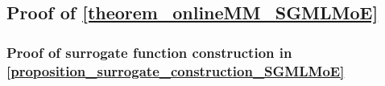 \documentclass{article}
\newcommand{\mdm}{softmax-gated multinomial logistic MoE }
\newcommand{\nn}{\nonumber} %
\newtheorem{proposition}{Proposition}
\def\sfg{\mathsf{g}}
\def\ex{\mathsf{e}}
\def\vxi{{\bm{\xi}}}
\def\vomega{{\bm{\omega}}}
\def\vupsilon{{\bm{\upsilon}}}
\def\vtheta{{\bm{\theta}}}
\def\vc{{\bm{c}}}
\def\vr{{\bm{r}}}
\def\vv{{\bm{v}}}
\def\vx{{\bm{x}}}
\def\evv{{v}}
\def\evw{{w}}
\def\mB{{\bm{B}}}
\begin{document}
\subsection{Proof of \texorpdfstring{\cref{theorem_onlineMM_SGMLMoE}}{Theorem \ref*{theorem_onlineMM_SGMLMoE}}}\label{proof_theorem_onlineMM_SGMLMoE}

\subsubsection{Proof of surrogate function construction in \texorpdfstring{\cref{proposition_surrogate_construction_SGMLMoE}}{Proposition \ref*{proposition_surrogate_construction_SGMLMoE}}}\label{proof_proposition_surrogate_construction_SGMLMoE}

\end{document}
